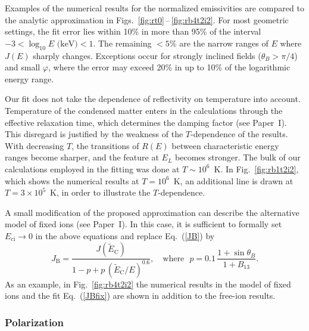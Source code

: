 \documentclass{aa}
\newcommand{\beq}{\begin{equation}}
\newcommand{\eeq}{\end{equation}}
\newcommand{\req}[1]{Eq.~(\ref{#1})}
\newcommand{\Eci}{E_\mathrm{ci}}
\newcommand{\tEC}{\tilde{E}_\mathrm{C}}
\begin{document}
Examples of the numerical results for the normalized 
emissivities are compared to the analytic approximation in
Figs.~\ref{fig:rt0}\,--\,\ref{fig:rb4t2i2}. For most
geometric settings, the fit error lies within 10\% in more
than 95\% of the interval $-3 < \log_{10}E\textrm{ (keV)} <
1$. The remaining $<5$\% are the narrow ranges of $E$ where
$J(E)$ sharply changes. Exceptions occur for
strongly inclined fields ($\theta_B>\pi/4$) and small $\varphi$,
where the error may exceed 20\% in up to
10\% of the logarithmic energy range.

Our fit does not take the dependence of
reflectivity on temperature into account. Temperature of the condensed
matter enters in the calculations through the effective
relaxation time, which determines the damping factor (see
Paper~I). This disregard is justified by the weakness of the
$T$-dependence of the results.  With decreasing $T$, the
transitions of $R(E)$ between characteristic energy ranges
become sharper, and the feature at $E_L$ becomes stronger.
The bulk of our calculations employed in the fitting was
done at $T\sim10^6$~K. In Fig.~\ref{fig:rb1t2i2}, which
shows the numerical results at $T=10^6$~K, 
an additional line is drawn at $T=3\times10^5$~K, 
in order to illustrate the $T$-dependence.

A small modification of the proposed approximation can describe
the alternative model of fixed ions (see Paper~I). In this
case, it is sufficient to formally set $\Eci\to0$ in the
above equations and replace \req{JB} by
\beq
   J_\mathrm{B} = \frac{J(\tEC)
      }{
         1-p+p\,(\tEC/E)^{0.6}
         },
\quad\textrm{where~~}
   p=0.1\,\frac{1+\sin\theta_B}{1+B_{13}}.
\label{JBfix}
\eeq
As an example, in Fig.~\ref{fig:rb4t2i2} the
numerical results
in the model of fixed ions and the
fit \req{JBfix} are shown in addition to the free-ion
results.

\subsubsection{Polarization}
\end{document}

